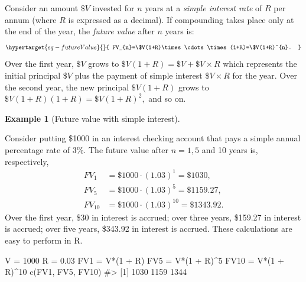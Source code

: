 \documentclass[
  letterpaper,
  DIV=11,
  numbers=noendperiod]{scrreprt}
\newenvironment{Shaded}{\begin{snugshade}}{\end{snugshade}}
\newcommand{\CommentTok}[1]{\textcolor[rgb]{0.37,0.37,0.37}{#1}}
\newcommand{\DecValTok}[1]{\textcolor[rgb]{0.68,0.00,0.00}{#1}}
\newcommand{\FloatTok}[1]{\textcolor[rgb]{0.68,0.00,0.00}{#1}}
\newcommand{\FunctionTok}[1]{\textcolor[rgb]{0.28,0.35,0.67}{#1}}
\newcommand{\NormalTok}[1]{\textcolor[rgb]{0.00,0.23,0.31}{#1}}
\newcommand{\OtherTok}[1]{\textcolor[rgb]{0.00,0.23,0.31}{#1}}
\newcommand{\SpecialCharTok}[1]{\textcolor[rgb]{0.37,0.37,0.37}{#1}}
\theoremstyle{definition}
\theoremstyle{definition}
\newtheorem{example}{Example}[chapter]
\theoremstyle{remark}
\begin{document}
Consider an amount \(\$V\) invested for \(n\) years at a \emph{simple
interest rate}  of \(R\) per annum (where
\(R\) is expressed as a decimal). If compounding takes place only at the
end of the year, the \emph{future value}  after
\(n\) years is: \begin{equation}\protect\hypertarget{eq-futureValue}{}{
FV_{n}=\$V(1+R)\times\cdots\times(1+R)=\$V(1+R)^{n}.
}\label{eq-futureValue}\end{equation} Over the first year, \(\$V\) grows
to \(\$V(1+R)=\$V+\$V\times R\) which represents the initial principal
\(\$V\) plus the payment of simple interest \(\$V\times R\) for the
year. Over the second year, the new principal \(\$V(1+R)\) grows to
\(\$V(1+R)(1+R)=\$V(1+R)^{2},\) and so on.

\begin{example}[Future value with simple
interest]\protect\hypertarget{exm-example0101}{}\label{exm-example0101}

Consider putting \$1000 in an interest checking account that pays a
simple annual percentage rate of 3\%. The future value after \(n=1,5\)
and 10 years is, respectively, \begin{align*}
FV_{1} & =\$1000\cdot(1.03)^{1}=\$1030,\\
FV_{5} & =\$1000\cdot(1.03)^{5}=\$1159.27,\\
FV_{10} & =\$1000\cdot(1.03)^{10}=\$1343.92.
\end{align*} Over the first year, \$30 in interest is accrued; over
three years, \$159.27 in interest is accrued; over five years, \$343.92
in interest is accrued. These calculations are easy to perform in R.

\end{example}

\begin{Shaded}
\begin{Highlighting}[]
\NormalTok{V }\OtherTok{=} \DecValTok{1000} 
\NormalTok{R }\OtherTok{=} \FloatTok{0.03} 
\NormalTok{FV1 }\OtherTok{=}\NormalTok{ V}\SpecialCharTok{*}\NormalTok{(}\DecValTok{1} \SpecialCharTok{+}\NormalTok{ R) }
\NormalTok{FV5 }\OtherTok{=}\NormalTok{ V}\SpecialCharTok{*}\NormalTok{(}\DecValTok{1} \SpecialCharTok{+}\NormalTok{ R)}\SpecialCharTok{\^{}}\DecValTok{5} 
\NormalTok{FV10 }\OtherTok{=}\NormalTok{ V}\SpecialCharTok{*}\NormalTok{(}\DecValTok{1} \SpecialCharTok{+}\NormalTok{ R)}\SpecialCharTok{\^{}}\DecValTok{10}
\FunctionTok{c}\NormalTok{(FV1, FV5, FV10)}
\CommentTok{\#\textgreater{} [1] 1030 1159 1344}
\end{Highlighting}
\end{Shaded}
\end{document}

